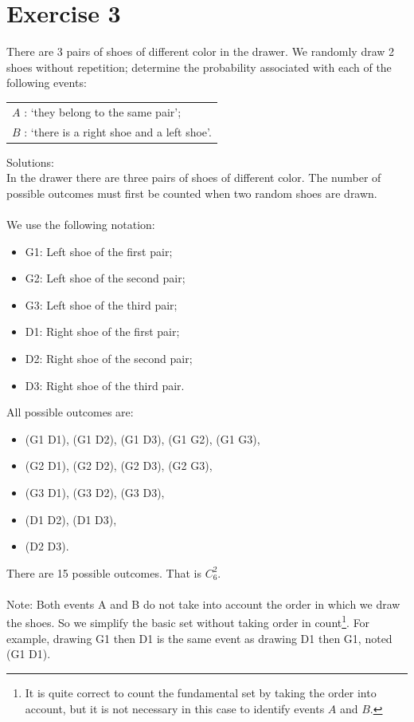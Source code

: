 \documentclass[12pt,thmsa]{article}
\begin{document}
\section*{Exercise 3}
There are 3 pairs of shoes of different color in the drawer. We randomly draw 2 shoes without repetition;
determine the probability associated with each of the following events:

 \begin{center}
 \begin{tabular}{l}
 $A$ : `they belong to the same pair';  \\
 $B$ : `there is a right shoe and a left shoe'.
 \end{tabular}
 \end{center}

\noindent Solutions:\\
In the drawer there are three pairs of shoes of different color. The number of possible outcomes must first be counted when two random shoes are drawn.\\
\\
We use the following notation:
\begin{itemize}
\item G1: Left shoe of the first pair;
\item G2: Left shoe of the second pair; 
\item G3: Left shoe of the third pair; 
\item D1: Right shoe of the first pair; 
\item D2: Right shoe of the second pair; 
\item D3: Right shoe of the third pair. 
\end{itemize}
\medskip
All possible outcomes are:
\begin{itemize}
\item (G1 D1), (G1 D2), (G1 D3), (G1 G2), (G1 G3),
\item (G2 D1), (G2 D2), (G2 D3), (G2 G3),
\item (G3 D1), (G3 D2), (G3 D3),
\item (D1 D2), (D1 D3),
\item (D2 D3).
\end{itemize}
\medskip
There are 15 possible outcomes. That is $C^{2}_{6}$.\\
\\
Note: 
Both events A and B do not take into account the order in which we
draw the shoes. So we simplify the basic set without taking order in count\footnote{It is quite correct to count the fundamental set by taking the order into account, but it is not necessary in this case to identify events $A$ and $B$.}. For example, drawing G1 then D1 is the same event as drawing D1 then G1, noted (G1 D1).\\
\newpage
\end{document}
